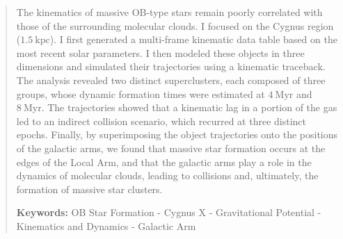 \documentclass[a4paper, 11pt]{article}
\begin{document}
\begin{abstract}
		The kinematics of massive OB-type stars remain poorly correlated with those of the surrounding molecular clouds. I focused on the Cygnus region ($1.5 \ \mathrm{kpc}$). I first generated a multi-frame kinematic data table based on the most recent solar parameters. I then modeled these objects in three dimensions and simulated their trajectories using a kinematic traceback. The analysis revealed two distinct superclusters, each composed of three groups, whose dynamic formation times were estimated at $4 \ \mathrm{Myr}$ and $8 \ \mathrm{Myr}$. The trajectories showed that a kinematic lag in a portion of the gas led to an indirect collision scenario, which recurred at three distinct epochs. Finally, by superimposing the object trajectories onto the positions of the galactic arms, we found that massive star formation occurs at the edges of the Local Arm, and that the galactic arms play a role in the dynamics of molecular clouds, leading to collisions and, ultimately, the formation of massive star clusters.
		
		\textbf{Keywords:} OB Star Formation - Cygnus X - Gravitational Potential - Kinematics and Dynamics - Galactic Arm		
		
	\end{abstract}
	
\end{document}
